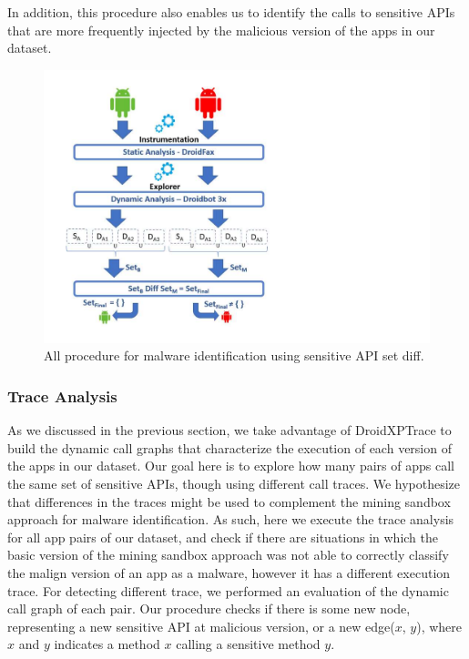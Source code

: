 In addition, this procedure also enables us to identify the calls to sensitive APIs that are more frequently injected by the malicious version of the apps
in our dataset. 


\begin{figure}[ht]
\centering
\includegraphics[scale=0.4]{images/sensitiveAPIdiff.pdf}
\caption{All procedure for malware identification using sensitive API set diff.}
 \label{fig:sensitiveAPI}
\end{figure}




\subsubsection{Trace Analysis} \label{sec:pathsetup}


As we discussed in the previous section, we take advantage of DroidXPTrace to build the dynamic call graphs that characterize the execution of each version of the apps in our dataset. Our goal
here is to explore how many pairs of apps call the same set of sensitive APIs, though using different call
traces. We hypothesize that differences in the traces might be used to complement the mining sandbox
approach for malware identification. As such, here we execute the trace
analysis for all app pairs of our dataset, and check if there are situations in which the basic version of the mining sandbox approach was not able to correctly classify the malign version of an app as a malware, however it has a different execution trace. For detecting different trace, we performed an evaluation of the dynamic call graph of each pair. Our procedure checks if there is some new node, representing a new sensitive API at malicious version, or a new edge($x$, $y$), where $x$ and $y$ indicates a method $x$ calling a sensitive method $y$.

